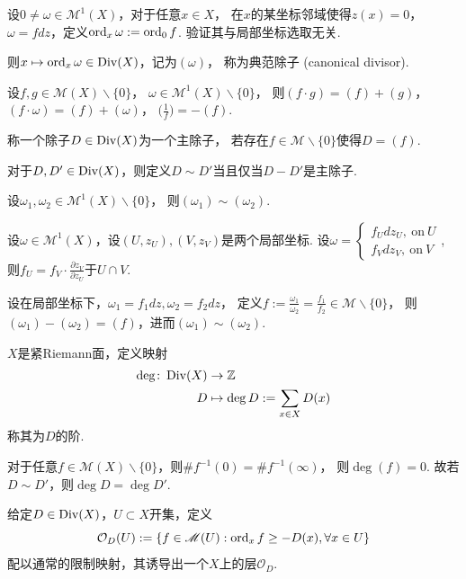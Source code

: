 \begin{example}
	设$0\neq \omega\in \mathscr{M}^1(X)$，对于任意$x\in X$，
    在$x$的某坐标邻域使得$z(x)=0$，$\omega=fdz$，定义$\operatorname{ord}_x\omega:=\operatorname{ord}_0 f$. 
    验证其与局部坐标选取无关.
			
	则$x\mapsto \operatorname{ord}_x \omega\in \operatorname{Div}(X)$，记为$(\omega)$，
    称为典范除子 (canonical divisor).	
		
	设$f,g\in \mathscr{M}(X)\backslash \{0\}$，
    $\omega\in \mathscr{M}^1(X)\backslash \{0\}$，
    则$(f\cdot g)=(f)+(g)$，$(f\cdot \omega)=(f)+(\omega)$，
    $\big(\frac{1}{f}\big)=-(f)$.
\end{example}

\begin{definition}
	称一个除子$D\in \operatorname{Div}(X)$为一个主除子，
    若存在$f\in \mathscr{M}\backslash \{0\}$使得$D=(f)$.

	对于$D, D'\in \operatorname{Div}(X)$，则定义$D\sim D'$当且仅当$D-D'$是主除子.
\end{definition}
		
\begin{example}
	设$\omega_1,\omega_2\in \mathscr{M}^1(X) \backslash\{0\}$，
    则$(\omega_1)\sim (\omega_2)$.
			
	设$\omega \in \mathscr{M}^1(X)$，设$(U,z_U), (V,z_V)$是两个局部坐标. 
    设$\omega=\begin{cases} f_Udz_U,\ \text{on} \ U\\ f_Vdz_V,\ \text{on}\ V \end{cases}$, 
    则$f_U=f_V\cdot \frac{\partial z_V}{\partial z_U}$于$U\cap V$.
			
	设在局部坐标下，$\omega_1=f_1 dz, \omega_2=f_2dz$，
    定义$f:=\frac{\omega_1}{\omega_2}=\frac{f_1}{f_2}\in \mathscr{M}\backslash \{0\}$，
    则$(\omega_1)-(\omega_2)=(f)$，进而$(\omega_1)\sim (\omega_2)$.
\end{example}

\begin{definition} $X$是紧Riemann面，定义映射
	\begin{align*}
		\deg\colon \operatorname{Div}(X) &\rightarrow \mathbb{Z}\\
		D &\mapsto \deg D:=\sum\limits_{x\in X} D(x)
	\end{align*}
称其为$D$的阶.
\end{definition}
		
对于任意$f\in \mathscr{M}(X)\backslash \{0\}$，则$\# f^{-1}(0)= \#f^{-1}(\infty)$，
则$\deg (f)=0$. 故若$D\sim D'$，则$\deg D=\deg D'$.

\begin{definition}
	给定$D\in \operatorname{Div}(X)$，$U\subset X$开集，定义
	$$\mathcal{O}_D(U):=\{f\in \mathscr{M}(U): \operatorname{ord}_xf\geq -D(x), \forall x\in U\}$$
	配以通常的限制映射，其诱导出一个$X$上的层$\mathcal{O}_D$.
\end{definition}

